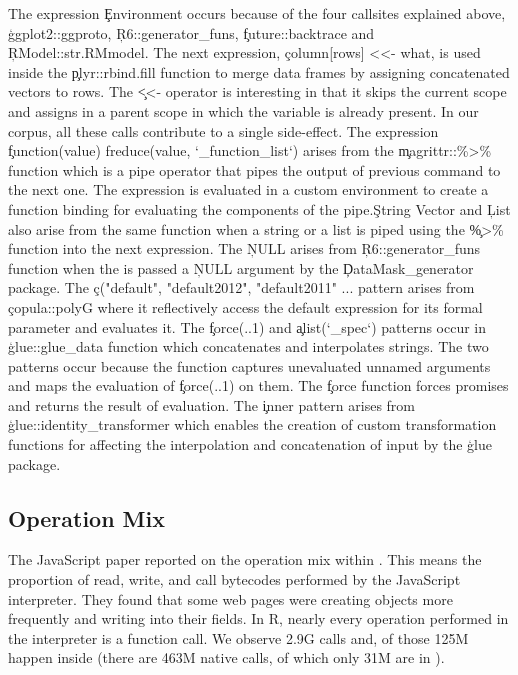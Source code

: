 \documentclass[conference]{IEEEtran}
\begin{document}
The expression \c{Environment} occurs because of the four callsites
explained above, \c{ggplot2::ggproto}, \c{R6::generator_funs},
\c{future::backtrace} and \c{RModel::str.RMmodel}. The next expression,
\c{column[rows] <<- what}, is used inside the \c{plyr::rbind.fill} function
to merge data frames by assigning concatenated vectors to rows. The \c{<<-}
operator is interesting in that it skips the current scope and assigns in a
parent scope in which the variable is already present. In our corpus, all
these \eval calls contribute to a single side-effect. The expression
\c{function(value) freduce(value, `_function_list`)} arises from the
\c{magrittr::\%>\%} function which is a pipe operator that pipes the output
of previous command to the next one. The expression is evaluated in a custom
environment to create a function binding for evaluating the components of
the pipe.\c{String Vector} and \c{List} also arise from the same function
when a string or a list is piped using the \c{\%>\%} function into the next
expression.  The \c{NULL} arises from \c{R6::generator_funs} function when
the \eval is passed a \c{NULL} argument by the \c{DataMask_generator}
package. The \c{c("default", "default2012", "default2011" ...} pattern
arises from \c{copula::polyG} where it reflectively access the default
expression for its formal parameter and evaluates it. The \c{force(..1)} and
\c{alist(`_spec`)} patterns occur in \c{glue::glue_data} function which
concatenates and interpolates strings. The two patterns occur because the
function captures unevaluated unnamed arguments and maps the evaluation of
\c{force(..1)} on them.  The \c{force} function forces promises and returns
the result of evaluation. The \c{inner} pattern arises from
\c{glue::identity_transformer} which enables the creation of custom
transformation functions for affecting the interpolation and concatenation
of input by the \c{glue} package.


\subsection{Operation Mix}

The JavaScript paper reported on the operation mix within \evals. This means
the proportion of read, write, and call bytecodes performed by the
JavaScript interpreter. They found that some web pages were creating objects
more frequently and writing into their fields.  In R, nearly every operation
performed in the interpreter is a function call. We observe 2.9G calls and,
of those 125M happen inside \eval (there are 463M native calls, of which
only 31M are in \eval).
\end{document}
